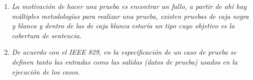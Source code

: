 \begin{enumerate}
    \item \textit{La motivación de hacer una prueba es encontrar un fallo, a partir de ahí hay múltiples  metodologías para realizar una prueba, existen pruebas de caja negra y blanca y dentro de las de caja blanca estaría un tipo cuyo objetivo es la cobertura de sentencia.}
    \item \textit{ De acuerdo con el IEEE 829, en la especificación de un caso de prueba se definen tanto las entradas como las salidas (datos de prueba) usados en la ejecución de los casos.}
\end{enumerate}




